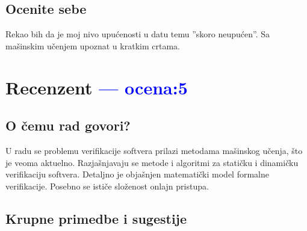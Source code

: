 \documentclass[a4paper]{report}
\newcommand{\odgovor}[1]{\textcolor{blue}{#1}}
\begin{document}
\section{Ocenite sebe}
Rekao bih da je moj nivo upućenosti u datu temu ”skoro neupućen”.
Sa mašinskim učenjem upoznat u kratkim crtama.


\chapter{Recenzent \odgovor{--- ocena:5} }

\section{O čemu rad govori?}

U radu se problemu verifikacije softvera prilazi metodama mašinskog učenja, što je veoma aktuelno.
Razjašnjavaju se metode i algoritmi za statičku i dinamičku verifikaciju softvera.
Detaljno je objašnjen matematički model formalne verifikacije.
Posebno se ističe složenost onlajn pristupa.

\section{Krupne primedbe i sugestije}
\end{document}
